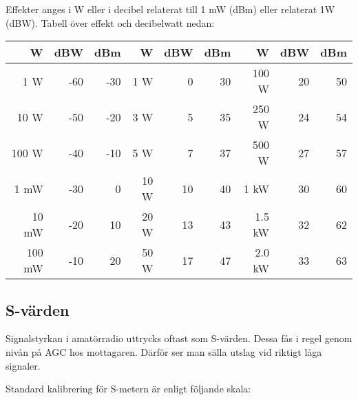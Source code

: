 Effekter anges i W eller i decibel relaterat till 1 mW (dBm) eller relaterat 1W (dBW). Tabell över effekt och decibelwatt nedan:
\begin{center}
\begin{tabular}{rrr|rrr|rrr}
	   \textbf{W} & \textbf{dBW} & \textbf{dBm} & \textbf{W} & \textbf{dBW} & \textbf{dBm} & \textbf{W} & \textbf{dBW} & \textbf{dBm} \\ \hline
	  1 \textmu W &          -60 &          -30 &        1 W &            0 &           30 &      100 W &           20 &           50 \\
	 10 \textmu W &          -50 &          -20 &        3 W &            5 &           35 &      250 W &           24 &           54 \\
	100 \textmu W &          -40 &          -10 &        5 W &            7 &           37 &      500 W &           27 &           57 \\
	         1 mW &          -30 &            0 &       10 W &           10 &           40 &       1 kW &           30 &           60 \\
	        10 mW &          -20 &           10 &       20 W &           13 &           43 &     1.5 kW &           32 &           62 \\
	       100 mW &          -10 &           20 &       50 W &           17 &           47 &     2.0 kW &           33 &           63
\end{tabular}
\end{center}

\subsection{S-värden}

Signalstyrkan i amatörradio uttrycks oftast som S-värden. Dessa fås i regel genom nivån på AGC hos mottagaren. Därför ser man sälla utslag vid riktigt låga signaler.

Standard kalibrering för S-metern är enligt följande skala:

